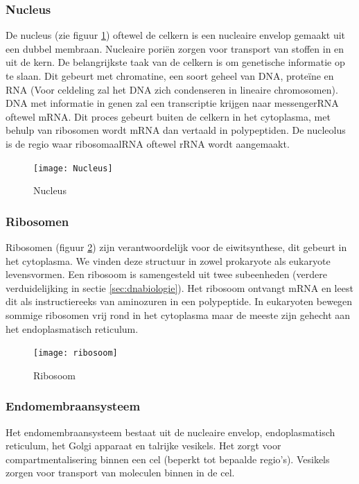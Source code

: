 \documentclass[a4paper,kul]{kulakarticle} %
\begin{document}
\subsubsection{Nucleus}
De nucleus (zie figuur \ref{fig:nucleus}) oftewel de celkern is een nucleaire envelop gemaakt uit een dubbel membraan. Nucleaire poriën zorgen voor transport van stoffen in en uit de kern. De belangrijkste taak van de celkern is om genetische informatie op te slaan. Dit gebeurt met chromatine, een soort geheel van DNA, proteïne en RNA (Voor celdeling zal het DNA zich condenseren in lineaire chromosomen). DNA met informatie in genen zal een transcriptie krijgen naar messengerRNA oftewel mRNA. Dit proces gebeurt buiten de celkern in het cytoplasma, met behulp van ribosomen wordt mRNA dan vertaald in polypeptiden. De nucleolus is de regio waar ribosomaalRNA oftewel rRNA wordt aangemaakt.
\begin{figure}[h]
	\centering
	\texttt{[image: Nucleus]}
	\caption[Nucleus]{Nucleus}
	\label{fig:nucleus}
\end{figure}

\subsubsection{Ribosomen}
Ribosomen (figuur \ref{fig:ribosoom}) zijn verantwoordelijk voor de eiwitsynthese, dit gebeurt in het cytoplasma. We vinden deze structuur in zowel prokaryote als eukaryote levensvormen. Een ribosoom is samengesteld uit twee subeenheden (verdere verduidelijking in sectie \ref{sec:dnabiologie}). Het ribosoom ontvangt mRNA en leest dit als instructiereeks van aminozuren in een polypeptide. In eukaryoten bewegen sommige ribosomen vrij rond in het cytoplasma maar de meeste zijn gehecht aan het endoplasmatisch reticulum. 
\begin{figure}[h]
	\centering
	\texttt{[image: ribosoom]}
	\caption[Ribosoom]{Ribosoom}
	\label{fig:ribosoom}
\end{figure}

\subsubsection{Endomembraansysteem}
Het endomembraansysteem bestaat uit de nucleaire envelop, endoplasmatisch reticulum, het Golgi apparaat en talrijke vesikels. Het zorgt voor compartmentalisering binnen een cel (beperkt tot bepaalde regio's). Vesikels zorgen voor transport van moleculen binnen in de cel.
\end{document}
